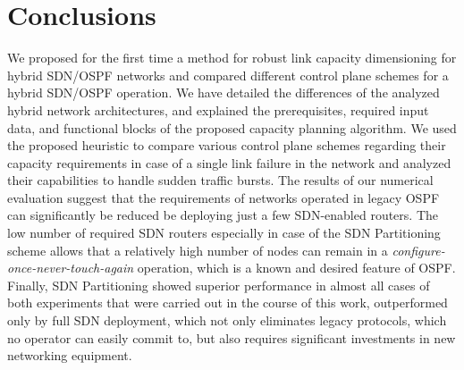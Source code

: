 \documentclass[10pt, conference]{IEEEtran}
\begin{document}
\section{Conclusions}\label{conclusions}
We proposed for the first time a method for robust link capacity dimensioning for hybrid SDN/OSPF networks and compared different control plane schemes for a hybrid SDN/OSPF operation. We have detailed the differences of the analyzed hybrid network architectures, and explained the prerequisites, required input data, and functional 
blocks of the proposed capacity planning algorithm. We used the proposed heuristic to compare various control plane schemes regarding their capacity requirements in case of a single link failure in the network and analyzed their capabilities to handle sudden traffic bursts. The results of our numerical evaluation suggest that the requirements of networks operated in legacy OSPF can significantly be reduced be deploying just a few SDN-enabled routers. The low number of required SDN routers especially in case of the SDN Partitioning scheme allows that a relatively high number of nodes can remain in a \emph{configure-once-never-touch-again} operation, which is a known and desired feature of OSPF. Finally, SDN Partitioning showed superior performance in almost all cases of both experiments that were carried out in the course of this work, outperformed only by full SDN deployment, which not only eliminates legacy protocols, which no operator can easily commit to, but also requires significant investments in new networking equipment.
\end{document}
